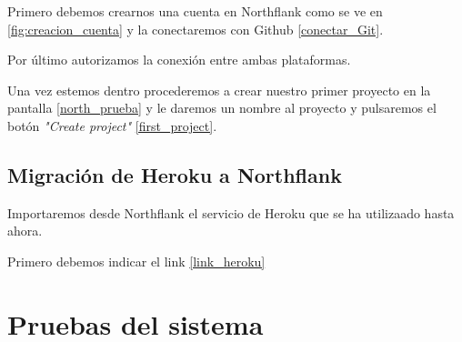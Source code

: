 Primero debemos crearnos una cuenta en Northflank como se ve en \ref{fig:creacion_cuenta} y la conectaremos con Github \ref{conectar_Git}.



Por último autorizamos la conexión entre ambas plataformas.

Una vez estemos dentro procederemos a crear nuestro primer proyecto en la pantalla \ref{north_prueba} y le daremos un nombre al proyecto y pulsaremos el botón \emph{"Create project"} \ref{first_project}.



\subsection{Migración de Heroku a Northflank}

Importaremos desde Northflank el servicio de Heroku que se ha utilizaado hasta ahora.

Primero debemos indicar el link \ref{link_heroku}



\section{Pruebas del sistema}
